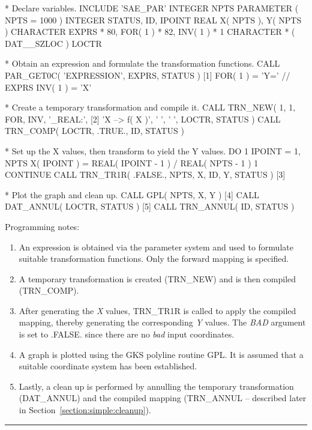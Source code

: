 \documentclass[twoside,nolof,11pt]{starlink}
\providecommand{\name}[1]{\small{#1}}
\providecommand{\fortvar}[1]{\emph{#1}}
\providecommand{\exampledone}[0]{\begin{center} \rule{6em}{0.2mm} \end{center}}
\begin{document}
\begin{terminalv}
*  Declare variables.
      INCLUDE 'SAE_PAR'
      INTEGER NPTS
      PARAMETER ( NPTS = 1000 )
      INTEGER STATUS, ID, IPOINT
      REAL X( NPTS ), Y( NPTS )
      CHARACTER EXPRS * 80, FOR( 1 ) * 82, INV( 1 ) * 1
      CHARACTER * ( DAT__SZLOC ) LOCTR

*  Obtain an expression and formulate the transformation functions.
      CALL PAR_GET0C( 'EXPRESSION', EXPRS, STATUS )           [1]
      FOR( 1 ) = 'Y=' // EXPRS
      INV( 1 ) = 'X'

*  Create a temporary transformation and compile it.
      CALL TRN_NEW( 1, 1, FOR, INV, '_REAL:',                 [2]
                    'X --> f( X )', ' ', ' ', LOCTR, STATUS )
      CALL TRN_COMP( LOCTR, .TRUE., ID, STATUS )

*  Set up the X values, then transform to yield the Y values.
      DO 1 IPOINT = 1, NPTS
         X( IPOINT ) = REAL( IPOINT - 1 ) / REAL( NPTS - 1 )
    1 CONTINUE
      CALL TRN_TR1R( .FALSE., NPTS, X, ID, Y, STATUS )        [3]

*  Plot the graph and clean up.
      CALL GPL( NPTS, X, Y )                                  [4]
      CALL DAT_ANNUL( LOCTR, STATUS )                         [5]
      CALL TRN_ANNUL( ID, STATUS )
\end{terminalv}

Programming notes:

\begin{enumerate}

\item An expression is obtained via the parameter system and used to
formulate suitable transformation functions.
Only the forward mapping is specified.

\item A temporary transformation is created (\name{TRN\_NEW}) and is then
compiled (\name{TRN\_COMP}).

\item After generating the \fortvar{X} values, \name{TRN\_TR1R} is called to
apply the compiled mapping, thereby generating the corresponding \fortvar{Y}
values.
The \fortvar{BAD} argument is set to \name{.FALSE.} since there are no \emph{bad} input coordinates.

\item A graph is plotted using the \name{GKS} polyline routine \name{GPL}.
It is assumed that a suitable coordinate system has been established.

\item Lastly, a clean up is performed by annulling the temporary
transformation (\name{DAT\_ANNUL}) and the compiled mapping
(\name{TRN\_ANNUL} -- described later in
Section~\ref{section:simple:cleanup}).

\end{enumerate}
\exampledone
\end{document}
